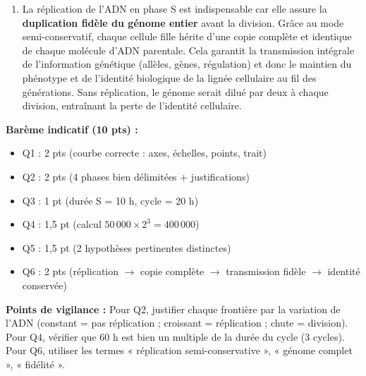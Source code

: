 \documentclass[11pt]{article}
\begin{document}
\begin{corrige}
\begin{enumerate}
\item La réplication de l'ADN en phase S est indispensable car elle assure la \textbf{duplication fidèle du génome entier} avant la division. Grâce au mode semi-conservatif, chaque cellule fille hérite d'une copie complète et identique de chaque molécule d'ADN parentale. Cela garantit la transmission intégrale de l'information génétique (allèles, gènes, régulation) et donc le maintien du phénotype et de l'identité biologique de la lignée cellulaire au fil des générations. Sans réplication, le génome serait dilué par deux à chaque division, entraînant la perte de l'identité cellulaire.
\end{enumerate}

\textbf{Barème indicatif (10 pts) :}
\begin{itemize}
\item Q1 : 2 pts (courbe correcte : axes, échelles, points, trait)
\item Q2 : 2 pts (4 phases bien délimitées + justifications)
\item Q3 : 1 pt (durée S = 10 h, cycle = 20 h)
\item Q4 : 1,5 pt (calcul $50\,000 \times 2^3 = 400\,000$)
\item Q5 : 1,5 pt (2 hypothèses pertinentes distinctes)
\item Q6 : 2 pts (réplication $\rightarrow$ copie complète $\rightarrow$ transmission fidèle $\rightarrow$ identité conservée)
\end{itemize}

\textbf{Points de vigilance :} Pour Q2, justifier chaque frontière par la variation de l'ADN (constant = pas réplication ; croissant = réplication ; chute = division). Pour Q4, vérifier que 60 h est bien un multiple de la durée du cycle (3 cycles). Pour Q6, utiliser les termes « réplication semi-conservative », « génome complet », « fidélité ».
\end{corrige}
\end{document}
